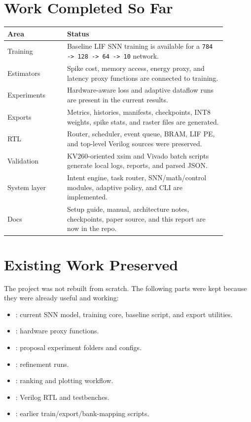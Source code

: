 \documentclass[11pt]{article}
\begin{document}
\section{Work Completed So Far}
\begin{center}
\begin{tabular}{p{0.24\linewidth}p{0.64\linewidth}}
\toprule
Area & Status \\
\midrule
Training & Baseline LIF SNN training is available for a \texttt{784 -> 128 -> 64 -> 10} network. \\
Estimators & Spike cost, memory access, energy proxy, and latency proxy functions are connected to training. \\
Experiments & Hardware-aware loss and adaptive dataflow runs are present in the current results. \\
Exports & Metrics, histories, manifests, checkpoints, INT8 weights, spike stats, and raster files are generated. \\
RTL & Router, scheduler, event queue, BRAM, LIF PE, and top-level Verilog sources were preserved. \\
Validation & KV260-oriented xsim and Vivado batch scripts generate local logs, reports, and parsed JSON. \\
System layer & Intent engine, task router, SNN/math/control modules, adaptive policy, and CLI are implemented. \\
Docs & Setup guide, manual, architecture notes, checkpoints, paper source, and this report are now in the repo. \\
\bottomrule
\end{tabular}
\end{center}

\section{Existing Work Preserved}
The project was not rebuilt from scratch. The following parts were kept because
they were already useful and working:
\begin{itemize}[leftmargin=*]
\item {}: current SNN model, training core, baseline script,
and export utilities.
\item {}: hardware proxy functions.
\item {}: proposal experiment folders and configs.
\item {}: refinement runs.
\item {}: ranking and plotting workflow.
\item {}: Verilog RTL and testbenches.
\item {}: earlier train/export/bank-mapping scripts.
\end{itemize}
\end{document}
